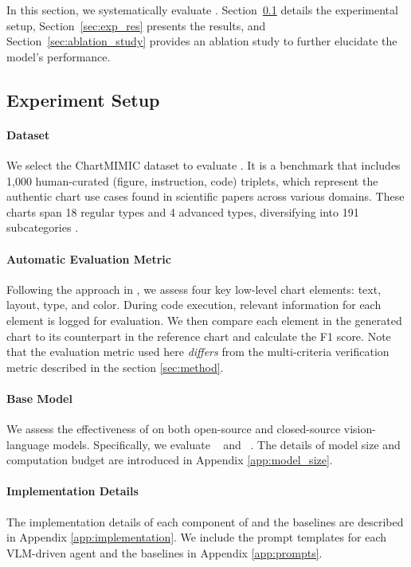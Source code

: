 In this section, we systematically evaluate \model{}. Section~\ref{sec:exp_setup} details the experimental setup, Section~\ref{sec:exp_res} presents the results, and Section~\ref{sec:ablation_study} provides an ablation study to further elucidate the model's performance.




\subsection{Experiment Setup}
\label{sec:exp_setup}

\paragraph{Dataset} We select the ChartMIMIC dataset to evaluate \model{}. It is a benchmark that includes 1,000 human-curated (figure, instruction, code) triplets, which represent the authentic chart use cases found in scientific papers across various domains. These charts span 18 regular types and 4 advanced types, diversifying into 191 subcategories \cite{shi2024chartmimic} .

\paragraph{Automatic Evaluation Metric}
Following the approach in \cite{shi2024chartmimic}, we assess four key low-level chart elements: text, layout, type, and color. During code execution, relevant information for each element is logged for evaluation. We then compare each element in the generated chart to its counterpart in the reference chart and calculate the F1 score. Note that the evaluation metric used here \textit{differs} from the multi-criteria verification metric described in the section \ref{sec:method}.

\paragraph{Base Model}
We assess the effectiveness of \model{} on both open-source and closed-source vision-language models. Specifically, we evaluate \gpt ~\cite{gpt4o} and \llama ~\cite{llama3modelcard}. The details of model size and computation budget are introduced in Appendix \ref{app:model_size}.

\paragraph{Implementation Details}  The implementation details of each component of \model{} and the baselines are described in Appendix \ref{app:implementation}. We include the prompt templates for each VLM-driven agent and the baselines in Appendix \ref{app:prompts}.



